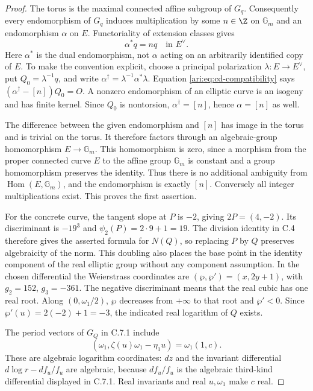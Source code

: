 \begin{proof}
The torus is the maximal connected affine subgroup of $G_q$.
Consequently every endomorphism of $G_q$ induces multiplication
by some $n\in\Z$ on $\mathbb G_m$ and an endomorphism
$\alpha$ on $E$. Functoriality of extension classes gives
\begin{equation}\label{ari:eq:cd-compatibility}
 \alpha^*q=nq\quad\text{in }E^\vee.
\end{equation}
Here $\alpha^*$ is the dual endomorphism, not $\alpha$
acting on an arbitrarily identified copy of $E$. To make the
convention explicit, choose a principal polarization
$\lambda:E\to E^\vee$, put $Q_0=\lambda^{-1}q$, and
write $\alpha^\dagger=\lambda^{-1}\alpha^*\lambda$.
Equation \eqref{ari:eq:cd-compatibility} says
$(\alpha^\dagger-[n])Q_0=O$. A nonzero endomorphism of an
elliptic curve is an isogeny and has finite kernel. Since
$Q_0$ is nontorsion, $\alpha^\dagger=[n]$, hence
$\alpha=[n]$ as well.

The difference between the given endomorphism and $[n]$ has
image in the torus and is trivial on the torus. It therefore
factors through an algebraic-group homomorphism
$E\to\mathbb G_m$. This homomorphism is zero, since a
morphism from the proper connected curve $E$ to the affine
group $\mathbb G_m$ is constant and a group homomorphism
preserves the identity. Thus there is no additional ambiguity
from $\operatorname{Hom}(E,\mathbb G_m)$, and the
endomorphism is exactly $[n]$. Conversely all integer
multiplications exist. This proves the first assertion.

For the concrete curve, the tangent slope at $P$ is $-2$,
giving $2P=(4,-2)$. Its discriminant is $-19^3$ and
$\psi_2(P)=2\cdot9+1=19$. The division identity in C.4
therefore gives the asserted formula for $N(Q)$, so replacing
$P$ by $Q$ preserves algebraicity of the norm. This doubling
also places the base point in the identity component of the
real elliptic group without any component assumption. In the
chosen differential the Weierstrass coordinates are
$(\wp,\wp')=(x,2y+1)$, with $g_2=152$, $g_3=-361$.
The negative discriminant means that the real cubic has one
real root. Along $(0,\omega_1/2)$, $\wp$ decreases from
$+\infty$ to that root and $\wp'<0$. Since
$\wp'(u)=2(-2)+1=-3$, the indicated real logarithm of $Q$
exists.

The period vectors of $G_Q$ in C.7.1 include
\[
 (\omega_1,\zeta(u)\omega_1-\eta_1u)
       =\omega_1(1,c).
\]
These are algebraic logarithm coordinates: $dz$ and the
invariant differential $d\log r-df_u/f_u$ are algebraic,
because $df_u/f_u$ is the algebraic third-kind differential
displayed in C.7.1. Real invariants and real $u,\omega_1$
make $c$ real.


\end{proof}
